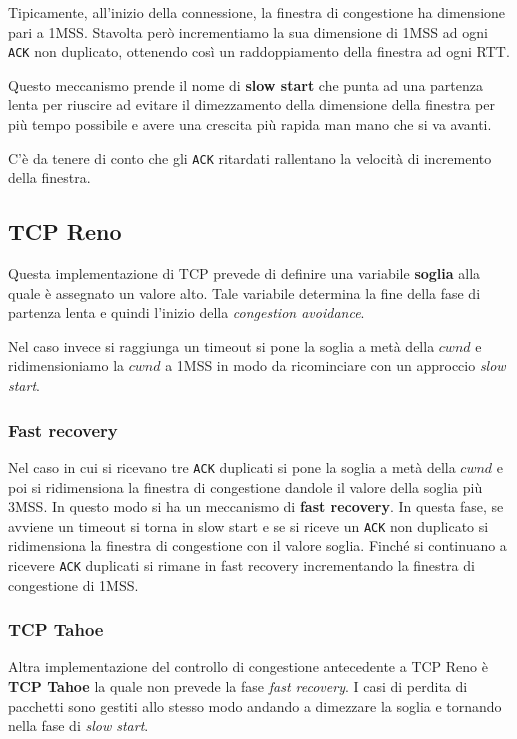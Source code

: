 Tipicamente, all'inizio della connessione, la finestra di congestione 
ha dimensione pari a 1MSS. Stavolta però incrementiamo la sua 
dimensione di 1MSS ad ogni \verb|ACK| non duplicato, ottenendo così un
raddoppiamento della finestra ad ogni RTT.

Questo meccanismo prende il nome di \textbf{slow start} che punta ad 
una partenza lenta per riuscire ad evitare il dimezzamento della 
dimensione della finestra per più tempo possibile e avere una crescita 
più rapida man mano che si va avanti.

C'è da tenere di conto che gli \verb|ACK| ritardati rallentano la 
velocità di incremento della finestra.

\subsection{TCP Reno}
Questa implementazione di TCP prevede di definire una variabile 
\textbf{soglia} alla quale è assegnato un valore alto. Tale variabile
determina la fine della fase di partenza lenta e quindi l'inizio della
\emph{congestion avoidance}.

Nel caso invece si raggiunga un timeout si pone la soglia a metà della 
$cwnd$ e ridimensioniamo la $cwnd$ a 1MSS in modo da ricominciare con 
un approccio \emph{slow start}.

\subsubsection{Fast recovery}
Nel caso in cui si ricevano tre \verb|ACK| duplicati si pone la soglia 
a metà della $cwnd$ e poi si ridimensiona la finestra di congestione 
dandole il valore della soglia più 3MSS. In questo modo si ha un 
meccanismo di \textbf{fast recovery}. In questa fase, se avviene un 
timeout si torna in slow start e se si riceve un \verb|ACK| non 
duplicato si ridimensiona la finestra di congestione con il valore 
soglia. Finché si continuano a ricevere \verb|ACK| duplicati si 
rimane in fast recovery incrementando la finestra di congestione di 
1MSS.

\subsubsection{TCP Tahoe}
Altra implementazione del controllo di congestione antecedente a TCP 
Reno è \textbf{TCP Tahoe} la quale non prevede la fase 
\emph{fast recovery}. I casi di perdita di pacchetti sono gestiti allo
stesso modo andando a dimezzare la soglia e tornando nella fase di 
\emph{slow start}.

